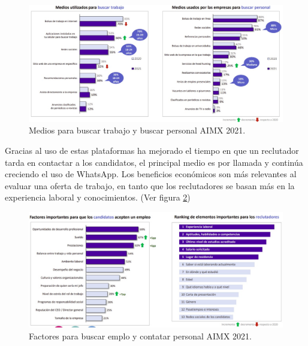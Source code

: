     \begin{figure}[H]
        \begin{center}
            \includegraphics[width=.7\textwidth]{antecedentes/imagenes/medios.jpeg}
        \end{center}
        \caption{Medios para buscar trabajo y buscar personal AIMX 2021.}
        \label{mark:med}
    \end{figure}

    Gracias al uso de estas plataformas ha mejorado el tiempo en que un reclutador tarda en contactar a los candidatos, el principal
    medio es por llamada y continúa creciendo el uso de WhatsApp. Los beneficios económicos son más relevantes al evaluar una oferta de
    trabajo, en tanto que los reclutadores se basan más en la experiencia laboral y conocimientos. (Ver figura \ref{mark:fac})

    \begin{figure}[H]
        \begin{center}
            \includegraphics[width=.7\textwidth]{antecedentes/imagenes/consideraciones.jpeg}
        \end{center}
        \caption{Factores para buscar emplo y contatar personal AIMX 2021.}
        \label{mark:fac}
    \end{figure}

